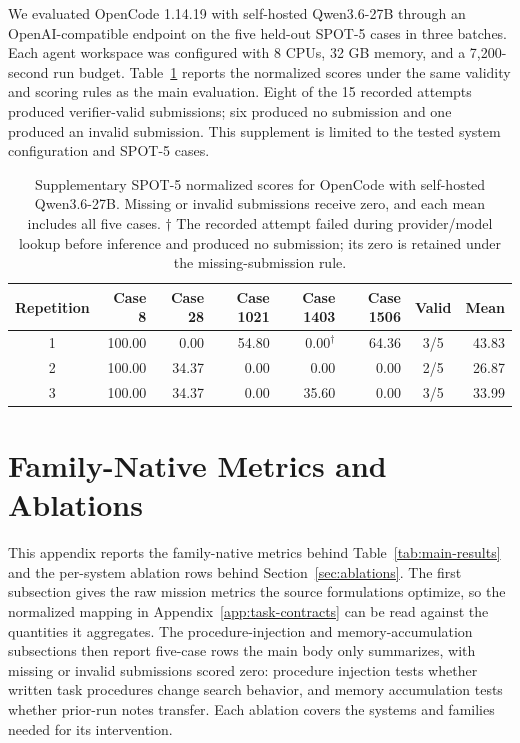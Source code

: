 \documentclass[11pt]{article}
\begin{document}
We evaluated OpenCode 1.14.19 with self-hosted Qwen3.6-27B through an OpenAI-compatible endpoint on the five held-out SPOT-5 cases in three batches. Each agent workspace was configured with 8 CPUs, 32 GB memory, and a 7,200-second run budget. Table~\ref{tab:qwen-supplement} reports the normalized scores under the same validity and scoring rules as the main evaluation. Eight of the 15 recorded attempts produced verifier-valid submissions; six produced no submission and one produced an invalid submission. This supplement is limited to the tested system configuration and SPOT-5 cases.

\begin{table}[!t]
\centering
\small
\setlength{\tabcolsep}{6pt}
\begin{tabular}{crrrrrcr}
\hline
\rowcolor{headerrow}
Repetition & Case 8 & Case 28 & Case 1021 & Case 1403 & Case 1506 & Valid & Mean \\
\hline
1 & 100.00 & 0.00 & 54.80 & \(0.00^{\dagger}\) & 64.36 & 3/5 & 43.83 \\
2 & 100.00 & 34.37 & 0.00 & 0.00 & 0.00 & 2/5 & 26.87 \\
3 & 100.00 & 34.37 & 0.00 & 35.60 & 0.00 & 3/5 & 33.99 \\
\hline
\end{tabular}
\caption{Supplementary SPOT-5 normalized scores for OpenCode with self-hosted Qwen3.6-27B. Missing or invalid submissions receive zero, and each mean includes all five cases. \(\dagger\) The recorded attempt failed during provider/model lookup before inference and produced no submission; its zero is retained under the missing-submission rule.}
\label{tab:qwen-supplement}
\end{table}

\clearpage
\section{Family-Native Metrics and Ablations}
\label{app:ablation-results}

This appendix reports the family-native metrics behind Table~\ref{tab:main-results} and the per-system ablation rows behind Section~\ref{sec:ablations}. The first subsection gives the raw mission metrics the source formulations optimize, so the normalized mapping in Appendix~\ref{app:task-contracts} can be read against the quantities it aggregates. The procedure-injection and memory-accumulation subsections then report five-case rows the main body only summarizes, with missing or invalid submissions scored zero: procedure injection tests whether written task procedures change search behavior, and memory accumulation tests whether prior-run notes transfer. Each ablation covers the systems and families needed for its intervention.
\end{document}
